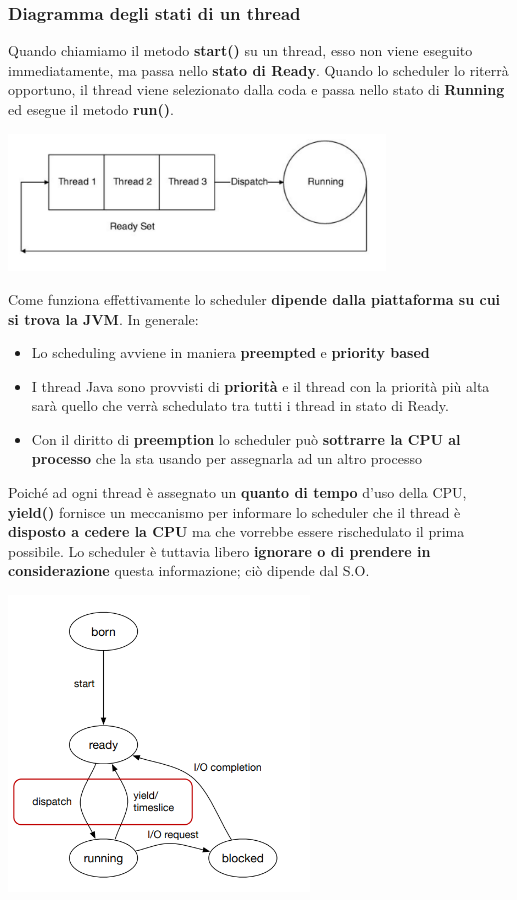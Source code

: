 \documentclass[12pt]{article}
\begin{document}
\subsubsection{Diagramma degli stati di un thread}
Quando chiamiamo il metodo \textbf{start()} su un thread, esso non viene eseguito immediatamente, ma passa nello \textbf{stato di Ready}. Quando lo scheduler lo riterrà opportuno, il thread viene selezionato dalla coda e passa nello stato di \textbf{Running} ed esegue il metodo \textbf{run()}.
\begin{center}
    \includegraphics[width = 0.75\textwidth]{Images/72.PNG}
\end{center}
Come funziona effettivamente lo scheduler \textbf{dipende dalla piattaforma su cui si trova la JVM}. In generale:
\begin{itemize}
    \item Lo scheduling avviene in maniera \textbf{preempted} e \textbf{priority based}
    \item I thread Java sono provvisti di \textbf{priorità} e il thread con la priorità più alta sarà quello che verrà schedulato tra tutti i thread in stato di Ready.
    \item Con il diritto di \textbf{preemption} lo scheduler può \textbf{sottrarre la CPU al processo} che la sta usando per assegnarla ad un altro processo
\end{itemize}
Poiché ad ogni thread è assegnato un \textbf{quanto di tempo} d'uso della CPU, \textbf{yield()} fornisce un meccanismo per informare lo scheduler che il thread è \textbf{disposto a cedere la CPU} ma che vorrebbe essere rischedulato il prima possibile. Lo scheduler è tuttavia libero \textbf{ignorare o di prendere in considerazione} questa informazione; ciò dipende dal S.O.
\begin{center}
    \includegraphics[width = 0.60\textwidth]{Images/73.PNG}
\end{center}
\end{document}
